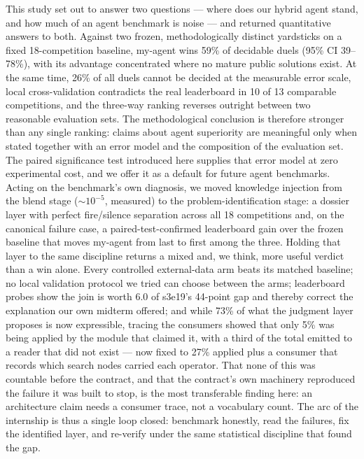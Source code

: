 \documentclass[11pt,a4paper]{article}
\begin{document}
This study set out to answer two questions --- where does our hybrid agent stand, and how much of an agent benchmark is noise --- and returned quantitative answers to both. Against two frozen, methodologically distinct yardsticks on a fixed 18-competition baseline, my-agent wins 59\% of decidable duels (95\% CI 39--78\%), with its advantage concentrated where no mature public solutions exist. At the same time, 26\% of all duels cannot be decided at the measurable error scale, local cross-validation contradicts the real leaderboard in 10 of 13 comparable competitions, and the three-way ranking reverses outright between two reasonable evaluation sets. The methodological conclusion is therefore stronger than any single ranking: claims about agent superiority are meaningful only when stated together with an error model and the composition of the evaluation set. The paired significance test introduced here supplies that error model at zero experimental cost, and we offer it as a default for future agent benchmarks. Acting on the benchmark's own diagnosis, we moved knowledge injection from the blend stage (${\sim}10^{-5}$, measured) to the problem-identification stage: a dossier layer with perfect fire/silence separation across all 18 competitions and, on the canonical failure case, a paired-test-confirmed leaderboard gain over the frozen baseline that moves my-agent from last to first among the three. Holding that layer to the same discipline returns a mixed and, we think, more useful verdict than a win alone. Every controlled external-data arm beats its matched baseline; no local validation protocol we tried can choose between the arms; leaderboard probes show the join is worth $6.0$ of s3e19's 44-point gap and thereby correct the explanation our own midterm offered; and while 73\% of what the judgment layer proposes is now expressible, tracing the consumers showed that only 5\% was being applied by the module that claimed it, with a third of the total emitted to a reader that did not exist --- now fixed to 27\% applied plus a consumer that records which search nodes carried each operator. That none of this was countable before the contract, and that the contract's own machinery reproduced the failure it was built to stop, is the most transferable finding here: an architecture claim needs a consumer trace, not a vocabulary count. The arc of the internship is thus a single loop closed: benchmark honestly, read the failures, fix the identified layer, and re-verify under the same statistical discipline that found the gap.
\end{document}
